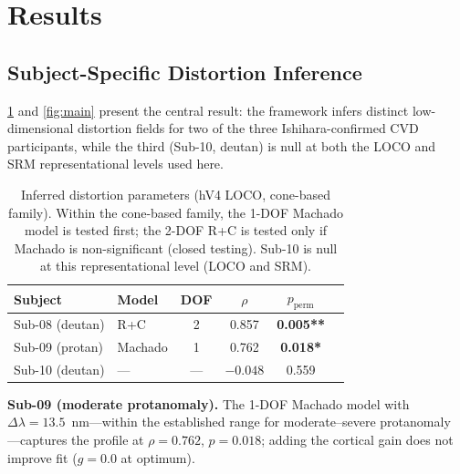 \documentclass{article}
\begin{document}
\section{Results}
\label{sec:results}

\subsection{Subject-Specific Distortion Inference}

\cref{tab:main} and \cref{fig:main} present the central result: the framework infers distinct low-dimensional distortion fields for two of the three Ishihara-confirmed CVD participants, while the third (Sub-10, deutan) is null at both the LOCO and SRM representational levels used here.

\begin{table}[t]
  \caption{Inferred distortion parameters (hV4 LOCO, cone-based family). Within the cone-based family, the 1-DOF Machado model is tested first; the 2-DOF R+C is tested only if Machado is non-significant (closed testing). Sub-10 is null at this representational level (LOCO and SRM).}
  \label{tab:main}
  \begin{center}
    \begin{small}
      \begin{tabular}{llcccc}
        \toprule
        Subject & Model & DOF & $\rho$ & $p_{\text{perm}}$ \\
        \midrule
        Sub-08 (deutan) & R+C & 2 & 0.857 & \textbf{0.005**} \\
        Sub-09 (protan) & Machado & 1 & 0.762 & \textbf{0.018*} \\
        Sub-10 (deutan) & --- & --- & $-0.048$ & 0.559 \\
        \bottomrule
      \end{tabular}
    \end{small}
  \end{center}
  \vskip -0.15in
\end{table}

\textbf{Sub-09 (moderate protanomaly).}
The 1-DOF Machado model with $\Delta\lambda = 13.5$~nm---within the established range for moderate--severe protanomaly \citep{machado2009}---captures the profile at $\rho = 0.762$, $p = 0.018$; adding the cortical gain does not improve fit ($g = 0.0$ at optimum).
\end{document}
